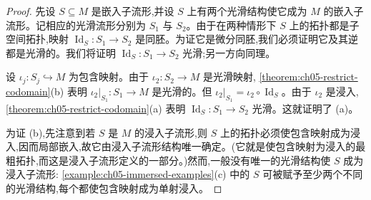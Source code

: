 \documentclass[../../main.tex]{subfiles}
\begin{document}
\begin{proof}
先设 $S\subseteq M$ 是嵌入子流形,并设 $S$ 上有两个光滑结构使它成为 $M$ 的嵌入子流形。记相应的光滑流形分别为 $S_1$ 与 $S_2$。由于在两种情形下 $S$ 上的拓扑都是子空间拓扑,映射 $\operatorname{Id}_S:S_1\to S_2$ 是同胚。为证它是微分同胚,我们必须证明它及其逆都是光滑的。我们将证明 $\operatorname{Id}_S:S_1\to S_2$ 光滑;另一方向同理。

设 $\iota_j:S_j\hookrightarrow M$ 为包含映射。由于 $\iota_2:S_2\to M$ 是光滑映射, \cref{theorem:ch05-restrict-codomain}(b) 表明 $\iota_2|_{S_1}:S_1\to M$ 是光滑的。但 $\iota_2|_{S_1}=\iota_2\circ\operatorname{Id}_S$。由于 $\iota_2$ 是浸入, \cref{theorem:ch05-restrict-codomain}(a) 表明 $\operatorname{Id}_S:S_1\to S_2$ 光滑。这就证明了 (a)。

为证 (b),先注意到若 $S$ 是 $M$ 的浸入子流形,则 $S$ 上的拓扑必须使包含映射成为浸入,因而局部嵌入,故它由浸入子流形结构唯一确定。(它就是使包含映射为浸入的最粗拓扑,而这是浸入子流形定义的一部分。)然而,一般没有唯一的光滑结构使 $S$ 成为浸入子流形: \cref{example:ch05-immersed-examples}(c) 中的 $S$ 可被赋予至少两个不同的光滑结构,每个都使包含映射成为单射浸入。
\end{proof}
\end{document}
